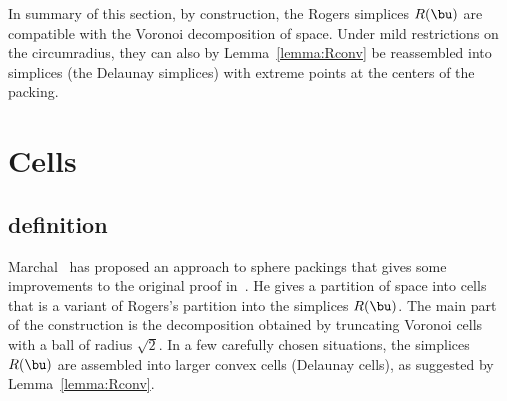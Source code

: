 In summary of this section, by construction, the Rogers simplices
$R(\bu)$ are compatible with the Voronoi decomposition of space.
Under mild restrictions on the circumradius, they can also by
Lemma~\ref{lemma:Rconv} be reassembled into simplices (the Delaunay
simplices) with extreme points at the centers of the packing.
%
%




\section{Cells}

\subsection{definition}


Marchal~\cite{marchal:2009} has proposed an approach to sphere
packings that gives some improvements to the original proof
in~\cite{Hales:2006:DCG}.  
He gives a partition of space into cells that is a variant of Rogers's partition into
the simplices $R(\bu)$.  The main part of the construction is the
decomposition obtained by truncating Voronoi cells with a ball of
radius $\sqrt2$.  In a few carefully chosen situations, the simplices
$R(\bu)$ are assembled into larger convex cells (Delaunay cells), as
suggested by Lemma~\ref{lemma:Rconv}.

%
%


